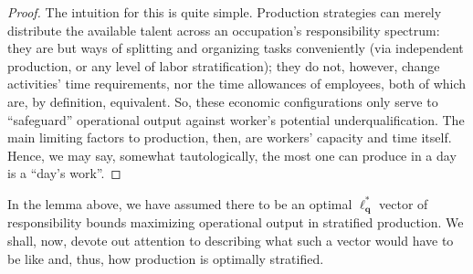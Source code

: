 \documentclass[hidelinks, nonatbib]{elsarticle}
\begin{document}
\begin{lemma}
\begin{proof}
        The intuition for this is quite simple. Production strategies can merely distribute the available talent across an occupation's responsibility spectrum: they are but ways of splitting and organizing tasks conveniently (via independent production, or any level of labor stratification); they do not, however, change activities' time requirements, nor the time allowances of employees, both of which are, by definition, equivalent. So, these economic configurations only serve to ``safeguard'' operational output against worker's potential underqualification. The main limiting factors to production, then, are workers' capacity and time itself. Hence, we may say, somewhat tautologically, the most one can produce in a day is a ``day's work''.
    \end{proof}
\end{lemma}

In the lemma above, we have assumed there to be an optimal $\boldsymbol{\ell_{q}^{*}}$ vector of responsibility bounds maximizing operational output in stratified production. We shall, now, devote out attention to describing what such a vector would have to be like and, thus, how production is optimally stratified.
\end{document}
